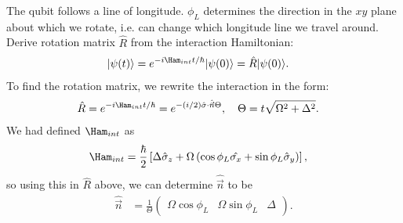 \documentclass[lasers.tex]{subfiles}
\begin{document}
The qubit follows a line of longitude. 
$\phi_L$ determines the direction in the $xy$ plane about which we rotate, i.e. can change which longitude line we travel around. 
Derive rotation matrix $\hat{R}$ from the interaction Hamiltonian:
\begin{align}
    |\psi(t)\rangle &= e^{-i\Ham_{int}t/\hbar}|\psi(0)\rangle = \hat{R}|\psi(0)\rangle.
\end{align}
To find the rotation matrix, we rewrite the interaction in the form:
\begin{align}
    \hat{R} &= e^{-i\Ham_{int}t/\hbar} = e^{-(i/2)\hat{\sigma}\cdot\hat{\vec{n}}\Theta},\quad \Theta = t\sqrt{\Omega^2+\Delta^2}.
\end{align}
We had defined $\Ham_{int}$ as 
\begin{align}
    \Ham_{int} &= \frac{\hbar}{2}\left[\Delta\hat{\sigma}_z + \Omega\left(\cos\phi_L\hat{\sigma_x}+\sin\phi_L\hat{\sigma}_y\right)\right],
\end{align}
so using this in $\hat{R}$ above, we can determine $\hat{\vec{n}}$ to be
\begin{align}
    \hat{\vec{n}} &= \frac{1}{\Theta}\begin{pmatrix} \Omega\cos\phi_L & \Omega\sin\phi_L & \Delta\end{pmatrix}.
\end{align}
\end{document}
